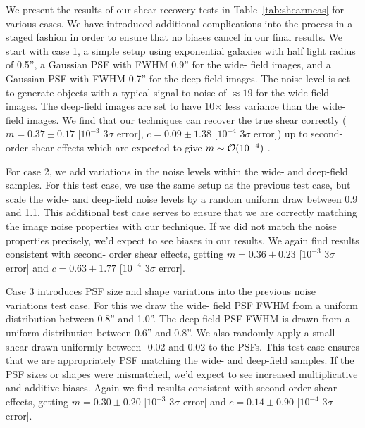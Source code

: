 \documentclass[twocolumn]{openjournal}
\begin{document}
We present the results of our shear recovery tests in Table~\ref{tab:shearmeas} for
various cases. We have introduced additional complications into the process in a staged
fashion in order to ensure that no biases cancel in our final results. We start with
case 1, a simple setup using exponential galaxies with half light radius of 0.5'', a
Gaussian PSF with FWHM 0.9'' for the wide- field images, and a Gaussian PSF with FWHM
0.7'' for the deep-field images. The noise level is set to generate objects with a
typical signal-to-noise of $\approx19$ for the wide-field images. The deep-field images
are set to have 10$\times$ less variance than the wide-field images. We find that our
techniques can recover the true shear correctly ($m=0.37\pm0.17$ [$10^{-3}$ $3\sigma$
error], $c=0.09\pm1.38$ [$10^{-4}$ $3\sigma$ error]) up to second-order shear effects
which are expected to give $m\sim{\cal O}(10^{-4})$
\citep{SheldonMcal2017,SheldonMdet2020}.

For case 2, we add variations in the noise levels within the wide- and deep-field
samples. For this test case, we use the same setup as the previous test case, but scale
the wide- and deep-field noise levels by a random uniform draw between 0.9 and 1.1. This
additional test case serves to ensure that we are correctly matching the image noise
properties with our technique. If we did not match the noise properties precisely, we'd
expect to see biases in our results. We again find results consistent with second- order
shear effects, getting $m=0.36\pm0.23$ [$10^{-3}$ $3\sigma$ error] and $c=0.63\pm1.77$
[$10^{-4}$ $3\sigma$ error].

Case 3 introduces PSF size and shape variations into the previous noise variations test
case. For this we draw the wide- field PSF FWHM from a uniform distribution between
0.8'' and 1.0''. The deep-field PSF FWHM is drawn from a uniform distribution between
0.6'' and 0.8''. We also randomly apply a small shear drawn uniformly between -0.02 and
0.02 to the PSFs. This test case ensures that we are appropriately PSF matching the
wide- and deep-field samples. If the PSF sizes or shapes were mismatched, we'd expect to
see increased multiplicative and additive biases. Again we find results consistent with
second-order shear effects, getting $m=0.30\pm0.20$ [$10^{-3}$ $3\sigma$ error] and
$c=0.14\pm0.90$ [$10^{-4}$ $3\sigma$ error].
\end{document}
